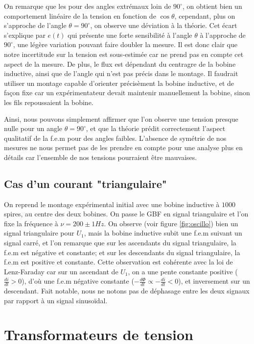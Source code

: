 \documentclass[11pt]{article}
\begin{document}
On remarque que les pour des angles extrémaux loin de $90^{\circ}$, on obtient bien un comportement linéaire de la tension en fonction de $\cos \theta$,
cependant, plus on s'approche de l'angle $\theta = 90^{\circ}$, on observe une déviation à la théorie. Cet écart s'explique par $e(t)$ qui présente une forte
sensibilité à l'angle $\theta$ à l'approche de $90^{\circ}$, une légère variation pouvant faire doubler la mesure. Il est donc clair que notre incertitude sur la tension est sous-estimée
car ne prend pas en compte cet aspect de la mesure. De plus, le flux est dépendant du centragre de la bobine inductive, ainsi que de l'angle qui n'est pas précis dans le montage.
Il faudrait utiliser un montage capable d'orienter précisèment la bobine inductive, et de façon fixe car un expérimentateur devait maintenir manuellement la bobine, sinon les fils 
repoussaient la bobine. 

Ainsi, nous pouvons simplement affirmer que l'on observe une tension presque nulle pour un angle $\theta = 90^{\circ}$, et que la théorie prédit correctement l'aspect qualitatif de la f.e.m pour des angles faibles.
L'absence de symétrie de nos mesures ne nous permet pas de les prendre en compte pour une analyse plus en détails car l'ensemble de nos tensions pourraient être mauvaises.

\subsection{Cas d'un courant "triangulaire"}
On reprend le montage expérimental initial avec une bobine inductive à $1000$ spires, au centre des deux bobines. On passe le GBF en signal triangulaire et l'on fixe la fréquence
à $\nu = 200 \pm 1 Hz$. On observe (voir figure \ref{fig:oscillo}) bien un signal triangulaire pour $U_1$, mais la bobine inductive subit une f.e.m suivant un signal carré, et l'on remarque
que sur les ascendants du signal triangulaire, la f.e.m est négative et constante; et sur les descendants du signal triangulaire, la f.e.m est positive et constante.
Cette observation est cohérente avec la loi de Lenz-Faraday car sur un ascendant de $U_1$, on a une pente constante positive ($\frac{di}{dt} > 0$), d'où une f.e.m négative constante ($-\frac{d\Phi}{dt} \propto -\frac{di}{dt} < 0$), et inversement sur un descendant.
Fait notable, nous ne notons pas de déphasage entre les deux signaux par rapport à un signal sinusoïdal.

\section{Transformateurs de tension}
\end{document}
